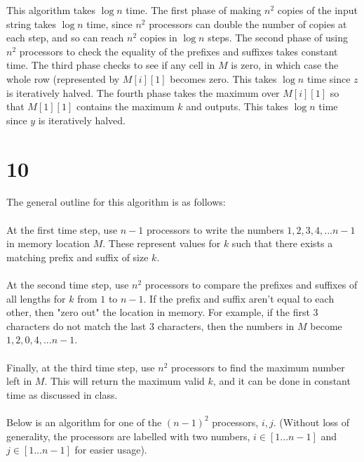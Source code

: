 \documentclass[letterpaper,notitlepage,twoside]{article}
\begin{document}
This algorithm takes $\log n$ time. The first phase of making $n^2$ copies of the input string takes $\log n$ time, since $n^2$ processors can double the number of copies at each step, and so can reach $n^2$ copies in $\log n$ steps. The second phase of using $n^2$ processors to check the equality of the prefixes and suffixes takes constant time. The third phase checks to see if any cell in $M$ is zero, in which case the whole row (represented by $M[i][1]$ becomes zero. This takes $\log n$ time since $z$ is iteratively halved. The fourth phase takes the maximum over $M[i][1]$ so that $M[1][1]$ contains the maximum $k$ and outputs. This takes $\log n$ time since $y$ is iteratively halved.

\section*{10}
The general outline for this algorithm is as follows:
\\\\
At the first time step, use $n - 1$ processors to write the numbers $1, 2, 3, 4, ... n - 1$ in memory location $M$. These represent values for $k$ such that there exists a matching prefix and suffix of size $k$.
\\\\
At the second time step, use $n^2$ processors to compare the prefixes and suffixes of all lengths for $k$ from $1$ to $n - 1$. If the prefix and suffix aren't equal to each other, then "zero out" the location in memory. For example, if the first 3 characters do not match the last 3 characters, then the numbers in $M$ become $1, 2, 0, 4, ... n -1$.
\\\\
Finally, at the third time step, use $n^2$ processors to find the maximum number left in $M$. This will return the maximum valid $k$, and it can be done in constant time as discussed in class.
\\\\
Below is an algorithm for one of the $(n - 1)^2$ processors, $i, j$. (Without loss of generality, the processors are labelled with two numbers, $i \in [1...n-1]$ and $j \in [1...n-1]$ for easier usage).
\end{document}

